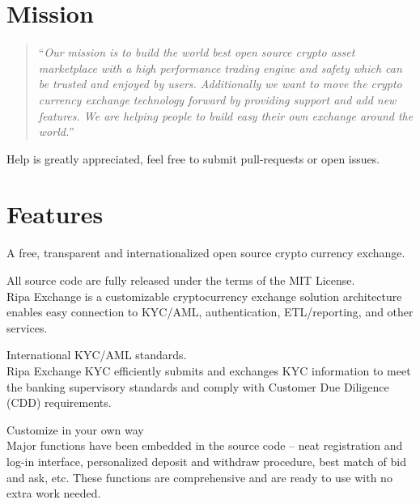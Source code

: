 \documentclass[11pt,fleqn,oneside]{book} %
\begin{document}
\section{Mission}
\begin{quotation}
	``\textit{Our mission is to build the world best open source crypto asset marketplace with a high performance trading engine 
	and safety which can be trusted and enjoyed by users. Additionally we want to move the crypto currency exchange technology 
	forward by providing support and add new features. We are helping people to build easy their own exchange around the world.}''
\end{quotation}

Help is greatly appreciated, feel free to submit pull-requests or open issues.

\section{Features}
A free, transparent and internationalized open source crypto currency exchange.\\

\begin{tcolorbox}[featureBox,
	title=\textsc{Open Source} \faCircleONotch]

	\small	All source code are fully released under the terms of the MIT License.\\\vspace{5mm}
	\tiny Ripa Exchange is a customizable cryptocurrency exchange solution architecture enables easy connection to KYC/AML, 
	authentication, ETL/reporting, and other services.
\end{tcolorbox}
\begin{tcolorbox}[featureBox,
	title=\textsc{Compliant} \faCheck]

	\small	International KYC/AML standards.\\\vspace{5mm}
	\tiny Ripa Exchange KYC efficiently submits and exchanges KYC information 
	to meet the banking supervisory standards and comply with Customer Due Diligence (CDD) requirements.
\end{tcolorbox}
\begin{tcolorbox}[featureBox,
	title=\textsc{Transparent \& Configurable} \faCogs]

	\small	Customize in your own way\\\vspace{5mm}
	\tiny Major functions have been embedded in the source code – neat registration and log-in interface, 
	personalized deposit and withdraw procedure, best match of bid and ask, etc. These functions are comprehensive 
	and are ready to use with no extra work needed. 
\end{tcolorbox}
\end{document}
